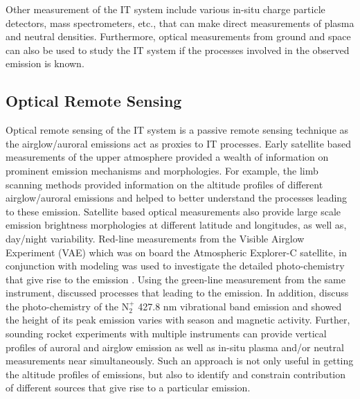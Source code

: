 \documentclass[crop=false,class=mitthesis,oneside,font=12pt]{standalone}
\begin{document}
Other measurement of the IT system include various in-situ charge particle detectors, mass spectrometers, etc., that can make direct measurements of plasma and neutral densities. Furthermore, optical measurements from ground and space can also be used to study the IT system if the processes involved in the observed emission is known. 

\subsection{Optical Remote Sensing}

Optical remote sensing of the IT system is a passive remote sensing technique as the airglow/auroral emissions act as proxies to IT processes. Early satellite based measurements of the upper atmosphere provided a wealth of information on prominent emission mechanisms and morphologies. For example, the limb scanning methods provided information on the altitude profiles of different airglow/auroral emissions and helped to better understand the processes leading to these emission. Satellite based optical measurements also provide large scale emission brightness morphologies at different latitude and longitudes, as well as, day/night variability. Red-line measurements from the Visible Airglow Experiment (VAE) which was on board the Atmospheric Explorer-C satellite, in conjunction with modeling was used to investigate the detailed photo-chemistry that give rise to the emission \citep{hays1978}. Using the green-line measurement from the same instrument, \cite{frederick1976} discussed processes that leading to the emission. In addition, \citet{orsini1977determination} discuss the photo-chemistry of the N$_2^+$ 427.8 nm vibrational band emission and  showed the height of its peak emission varies with season and magnetic activity. Further, sounding rocket experiments with multiple instruments can provide vertical profiles of auroral and airglow emission as well as in-situ plasma and/or neutral measurements near simultaneously. Such an approach is not only useful in getting the altitude profiles of emissions, but also to identify and constrain contribution of different sources that give rise to a particular emission.
\end{document}
